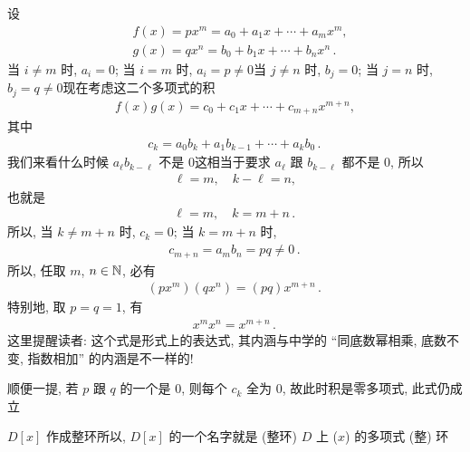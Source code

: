 \begin{remark}
    设
    \begin{align*}
         & f(x) = px^m = a_0 + a_1 x + \cdots + a_m x^m,        \\
         & g(x) = qx^n = b_0 + b_1 x + \cdots + b_n x^n \period
    \end{align*}
    当 $i \neq m$ 时, $a_i = 0$; 当 $i=m$ 时, $a_i = p \neq 0$\period 当 $j \neq n$ 时, $b_j = 0$; 当 $j=n$ 时, $b_j = q \neq 0$\period 现在考虑这二个多项式的积
    \begin{align*}
        f(x)g(x) = c_0 + c_1 x + \cdots + c_{m+n} x^{m+n},
    \end{align*}
    其中
    \begin{align*}
        c_k = a_0 b_k + a_1 b_{k-1} + \cdots + a_k b_0 \period
    \end{align*}
    我们来看什么时候 $a_\ell b_{k - \ell}$ 不是 $0$\period 这相当于要求 $a_\ell$ 跟 $b_{k - \ell}$ 都不是 $0$, 所以
    \begin{align*}
        \ell = m, \quad k - \ell = n,
    \end{align*}
    也就是
    \begin{align*}
        \ell = m, \quad k = m + n \period
    \end{align*}
    所以, 当 $k \neq m+n$ 时, $c_k = 0$; 当 $k = m+n$ 时,
    \begin{align*}
        c_{m+n} = a_m b_n = pq \neq 0\period
    \end{align*}
    所以, 任取 $m$, $n \in \mathbb{N}$, 必有
    \begin{align*}
        (px^m) (qx^n) = (pq) x^{m+n} \period
    \end{align*}
    特别地, 取 $p=q=1$, 有
    \begin{align*}
        x^m x^n = x^{m+n} \period
    \end{align*}
    这里提醒读者: 这个式是形式上的表达式, 其内涵与中学的 ``同底数幂相乘, 底数不变, 指数相加'' 的内涵是不一样的!

    顺便一提, 若 $p$ 跟 $q$ 的一个是 $0$, 则每个 $c_k$ 全为 $0$, 故此时积是零多项式, 此式仍成立\period
\end{remark}

\begin{proposition}
    $D[x]$ 作成整环\period 所以, $D[x]$ 的一个名字就是 (整环) $D$ 上 ($x$) 的多项式 (整) 环\period
\end{proposition}

